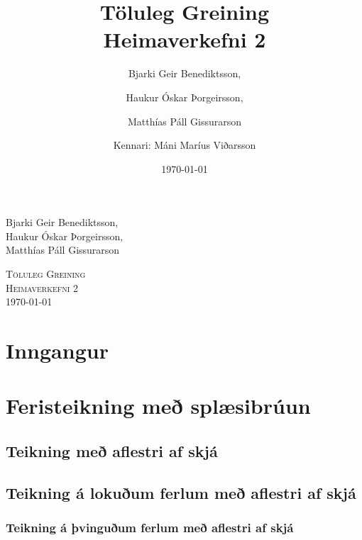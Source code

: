 \documentclass[a4]{article}
\title{Töluleg Greining\\ Heimaverkefni 2}
\date{\today{}}
\author{ 
  Bjarki Geir Benediktsson,\and
  Haukur Óskar Þorgeirsson,\and
  Matthías Páll Gissurarson \and
  Kennari: Máni Maríus Viðarsson
  }
\begin{document}
\begin{flushright}
  Bjarki Geir Benediktsson,\\
  Haukur Óskar Þorgeirsson,\\
  Matthías Páll Gissurarson\\
\end{flushright}

\begin{center}
 \textsc{ \LARGE Töluleg Greining\\
  Heimaverkefni 2\\
  \today{}
  }
  \end{center}
\vfill

\maketitle
\section*{Inngangur}
\section{Feristeikning með splæsibrúun}
\subsection{Teikning með aflestri af skjá}

\subsection{Teikning á lokuðum ferlum með aflestri af skjá}

\subsubsection{Teikning á þvinguðum ferlum með aflestri af skjá }

\end{document}

